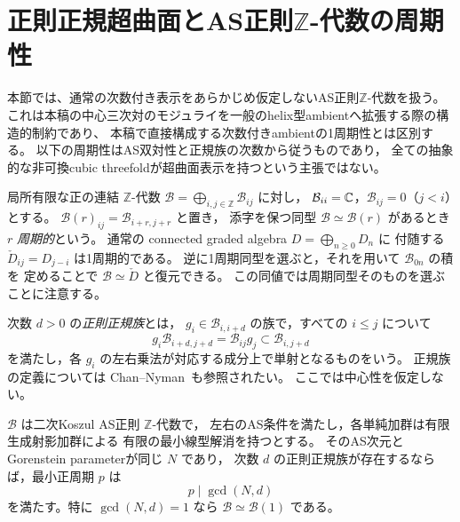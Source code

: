 \section{正則正規超曲面とAS正則$\mathbb Z$-代数の周期性}\label{sec:moduli-ambient-periodicity}
本節では、通常の次数付き表示をあらかじめ仮定しないAS正則$\mathbb Z$-代数を扱う。
これは本稿の中心三次対のモジュライを一般のhelix型ambientへ拡張する際の構造的制約であり、
本稿で直接構成する次数付きambientの1周期性とは区別する。
以下の周期性はAS双対性と正規族の次数から従うものであり，
全ての抽象的な非可換cubic threefoldが超曲面表示を持つという主張ではない。

局所有限な正の連結 $\mathbb Z$-代数
$\mathcal B=\bigoplus_{i,j\in\mathbb Z}\mathcal B_{ij}$ に対し，
$\mathcal B_{ii}=\mathbb C$，$\mathcal B_{ij}=0$（$j<i$）とする。
$\mathcal B(r)_{ij}=\mathcal B_{i+r,j+r}$ と置き，
添字を保つ同型 $\mathcal B\simeq\mathcal B(r)$ があるとき
$r$ \emph{周期的}という。
通常の connected graded algebra $D=\bigoplus_{n\geq0}D_n$ に
付随する $\check D_{ij}=D_{j-i}$ は1周期的である。
逆に1周期同型を選ぶと，それを用いて $\mathcal B_{0n}$ の積を
定めることで $\mathcal B\simeq\check D$ と復元できる。
この同値では周期同型そのものを選ぶことに注意する。

次数 $d>0$ の\emph{正則正規族}とは，
$g_i\in\mathcal B_{i,i+d}$ の族で，すべての $i\leq j$ について
\begin{equation}\label{eq:moduli-ambient-normal-family}
 g_i\mathcal B_{i+d,j+d}
 =\mathcal B_{ij}g_j\subset\mathcal B_{i,j+d}
\end{equation}
を満たし，各 $g_i$ の左右乗法が対応する成分上で単射となるものをいう。
正規族の定義については
Chan--Nyman~\cite[Definition~8.6]{PChanNymanNormalFamily}も参照されたい。
ここでは中心性を仮定しない。

\begin{theorem}\label{thm:moduli-ambient-gcd}
$\mathcal B$ は二次Koszul AS正則 $\mathbb Z$-代数で，
左右のAS条件を満たし，各単純加群は有限生成射影加群による
有限の最小線型解消を持つとする。
そのAS次元とGorenstein parameterが同じ $N$ であり，
次数 $d$ の正則正規族が存在するならば，最小正周期 $p$ は
\begin{equation}
 p\mid\gcd(N,d)
\end{equation}
を満たす。特に $\gcd(N,d)=1$ なら
$\mathcal B\simeq\mathcal B(1)$ である。
\end{theorem}

